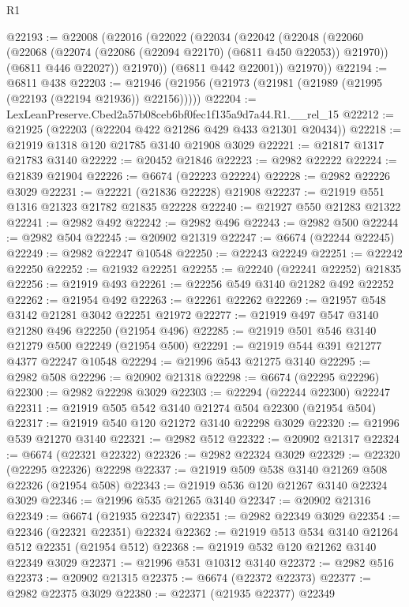 \begin{lexlean}{R1}
\begin{coremodule}
@22193 := @22008
    (@22016
      (@22022
        (@22034
          (@22042
            (@22048
              (@22060
                (@22068 (@22074 (@22086 (@22094 @22170) (@6811 @450 @22053)) @21970))
                (@6811 @446 @22027))
              @21970))
          (@6811 @442 @22001))
        @21970))
@22194 := @6811 @438
@22203 := @21946 (@21956 (@21973 (@21981 (@21989 (@21995 (@22193 (@22194 @21936)) @22156)))))
@22204 := LexLeanPreserve.Cbed2a57b08ceb6bf0fec1f135a9d7a44.R1.__rel_15
@22212 := @21925 (@22203 (@22204 @422 @21286 @429 @433 @21301 @20434))
@22218 := @21919 @1318 @120 @21785 @3140 @21908 @3029
@22221 := @21817 @1317 @21783 @3140
@22222 := @20452 @21846
@22223 := @2982 @22222
@22224 := @21839 @21904
@22226 := @6674 (@22223 @22224)
@22228 := @2982 @22226 @3029
@22231 := @22221 (@21836 @22228) @21908
@22237 := @21919 @551 @1316 @21323 @21782 @21835 @22228
@22240 := @21927 @550 @21283 @21322
@22241 := @2982 @492
@22242 := @2982 @496
@22243 := @2982 @500
@22244 := @2982 @504
@22245 := @20902 @21319
@22247 := @6674 (@22244 @22245)
@22249 := @2982 @22247 @10548
@22250 := @22243 @22249
@22251 := @22242 @22250
@22252 := @21932 @22251
@22255 := @22240 (@22241 @22252) @21835
@22256 := @21919 @493
@22261 := @22256 @549 @3140 @21282 @492 @22252
@22262 := @21954 @492
@22263 := @22261 @22262
@22269 := @21957 @548 @3142 @21281 @3042 @22251 @21972
@22277 := @21919 @497 @547 @3140 @21280 @496 @22250 (@21954 @496)
@22285 := @21919 @501 @546 @3140 @21279 @500 @22249 (@21954 @500)
@22291 := @21919 @544 @391 @21277 @4377 @22247 @10548
@22294 := @21996 @543 @21275 @3140
@22295 := @2982 @508
@22296 := @20902 @21318
@22298 := @6674 (@22295 @22296)
@22300 := @2982 @22298 @3029
@22303 := @22294 (@22244 @22300) @22247
@22311 := @21919 @505 @542 @3140 @21274 @504 @22300 (@21954 @504)
@22317 := @21919 @540 @120 @21272 @3140 @22298 @3029
@22320 := @21996 @539 @21270 @3140
@22321 := @2982 @512
@22322 := @20902 @21317
@22324 := @6674 (@22321 @22322)
@22326 := @2982 @22324 @3029
@22329 := @22320 (@22295 @22326) @22298
@22337 := @21919 @509 @538 @3140 @21269 @508 @22326 (@21954 @508)
@22343 := @21919 @536 @120 @21267 @3140 @22324 @3029
@22346 := @21996 @535 @21265 @3140
@22347 := @20902 @21316
@22349 := @6674 (@21935 @22347)
@22351 := @2982 @22349 @3029
@22354 := @22346 (@22321 @22351) @22324
@22362 := @21919 @513 @534 @3140 @21264 @512 @22351 (@21954 @512)
@22368 := @21919 @532 @120 @21262 @3140 @22349 @3029
@22371 := @21996 @531 @10312 @3140
@22372 := @2982 @516
@22373 := @20902 @21315
@22375 := @6674 (@22372 @22373)
@22377 := @2982 @22375 @3029
@22380 := @22371 (@21935 @22377) @22349

\end{coremodule}
\end{lexlean}
